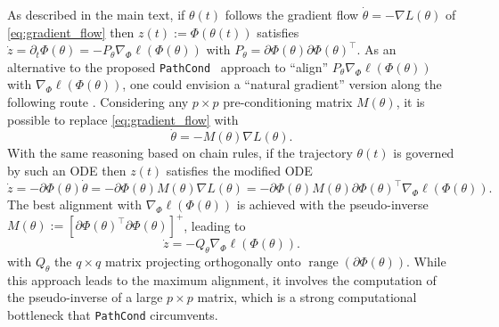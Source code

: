 \documentclass{article}
\theoremstyle{plain}
\theoremstyle{definition}
\theoremstyle{remark}
\def\pathcond{{\texttt{PathCond} }}
\begin{document}
{As described in the main text, if $\theta(t)$ follows the gradient flow $\dot{\theta} = -\nabla L(\theta)$ of \eqref{eq:gradient_flow} then $z(t) := \Phi(\theta(t))$ satisfies $\dot{z} = \partial_{t}\Phi(\theta) = -P_{\theta} \nabla_{\Phi} \ell(\Phi(\theta))$ with $P_{\theta}=\partial \Phi(\theta) \partial \Phi(\theta)^{\top}$. As an alternative to the proposed \pathcond\ approach to ``align'' $P_{\theta} \nabla_{\Phi} \ell(\Phi(\theta))$ with $ \nabla_{\Phi} \ell(\Phi(\theta))$, one could envision a ``natural gradient'' version along the following route \citep{amari1998natural,verbockhaven2024growing}. Considering any $p \times p$ pre-conditioning matrix $M(\theta)$, it is possible to replace \eqref{eq:gradient_flow}  with
\begin{equation}
\label{eq:natural_gradient_flow}
\dot{\theta} = -M(\theta) \nabla L(\theta).
\end{equation}
With the same reasoning based on chain rules, if the trajectory $\theta(t)$ is governed by such an ODE then $z(t)$ satisfies the modified ODE
\begin{equation}
\label{eq:phi_noneuclidean_gradient_flow}
\dot{z} = -\partial \Phi(\theta) \dot{\theta} 
= -\partial \Phi(\theta) M(\theta) \nabla L(\theta)
= -\partial \Phi(\theta) M(\theta) \partial\Phi(\theta)^{\top} \nabla_{\Phi} \ell(\Phi(\theta)).
\end{equation}
The best alignment with $ \nabla_{\Phi} \ell(\Phi(\theta))$ is achieved with the pseudo-inverse $M(\theta) := [\partial \Phi(\theta)^{\top} \partial \Phi(\theta)]^{+}$, leading to 
\begin{equation}
\label{eq:phi_noneuclidean_gradient_flow}
\dot{z} = - Q_{\theta} \nabla_{\Phi} \ell(\Phi(\theta)).
\end{equation}
with $Q_{\theta}$ the $q \times q$ matrix projecting orthogonally onto $\operatorname{range}(\partial \Phi(\theta))$.
While this approach leads to the maximum alignment, it involves the computation of the pseudo-inverse of a large $p \times p$ matrix, which is a strong computational bottleneck that  \pathcond circumvents.


}
\end{document}
